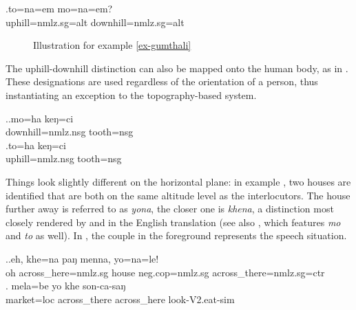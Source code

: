 \exg.\label{ex-gumthali}to=na=em mo=na=em?\\
uphill{\sc =nmlz.sg=alt} downhill{\sc =nmlz.sg=alt}\\

\begin{figure}
\centering
\setlength{\fboxsep}{0pt}
\caption{Illustration for example \ref{ex-gumthali}}\label{deixill-2}
\end{figure}

The uphill-downhill distinction can also be mapped onto the human body, as in \Next. These designations are used regardless of the orientation of a person, thus instantiating an exception to the topography-based system.

\ex.\ag.mo=ha keŋ=ci \\
downhill{\sc =nmlz.nsg} tooth{\sc =nsg} \\
\bg.to=ha keŋ=ci\\
uphill{\sc =nmlz.nsg} tooth{\sc =nsg} \\


Things look slightly different on the horizontal plane: in example \Next[a], two houses are identified  that are both on the same altitude level as the interlocutors. The house further away is referred to as \emph{yona}, the closer one is \emph{khena}, a distinction most closely rendered by  and  in the English translation (see also , which  features  \emph{mo} and \emph{to} as well). In , the couple in the foreground represents the speech situation.

\ex.\ag.\label{khenamenna}eh, khe=na paŋ menna, yo=na=le!\\
oh across\_here{\sc =nmlz.sg} house {\sc neg.cop=nmlz.sg} across\_there{\sc =nmlz.sg=ctr}\\
 \bg. mela=be      yo   khe    son-ca-saŋ\\
market{\sc =loc} across\_there across\_here look{\sc -V2.eat-sim} \\
 
 
